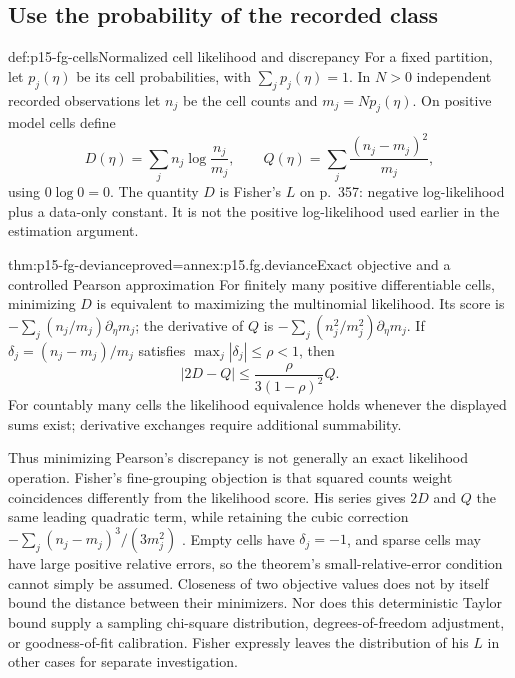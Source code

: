 \subsection{Use the probability of the recorded class}

\begin{hbdefinition}{def:p15-fg-cells}{Normalized cell likelihood and discrepancy}
For a fixed partition, let \(p_j(\eta)\) be its cell probabilities, with
\(\sum_jp_j(\eta)=1\). In \(N>0\) independent recorded observations let
\(n_j\) be the cell counts and \(m_j=Np_j(\eta)\). On positive model
cells define
\[
 D(\eta)=\sum_jn_j\log\frac{n_j}{m_j},\qquad
 Q(\eta)=\sum_j\frac{(n_j-m_j)^2}{m_j},
\]
using \(0\log0=0\). The quantity \(D\) is Fisher's \(L\) on p.~357:
negative log-likelihood plus a data-only constant. It is not the
positive log-likelihood used earlier in the estimation argument.
\end{hbdefinition}

\begin{hbtheorem}{thm:p15-fg-deviance}{proved=annex:p15.fg.deviance}{Exact objective and a controlled Pearson approximation}
For finitely many positive differentiable cells, minimizing \(D\) is
equivalent to maximizing the multinomial likelihood. Its score is
\(-\sum_j(n_j/m_j)\partial_\eta m_j\); the derivative of \(Q\) is
\(-\sum_j(n_j^2/m_j^2)\partial_\eta m_j\).
If \(\delta_j=(n_j-m_j)/m_j\) satisfies
\(\max_j|\delta_j|\leq\rho<1\), then
\[
 |2D-Q|\leq\frac{\rho}{3(1-\rho)^2}Q.
\]
For countably many cells the likelihood equivalence holds whenever the
displayed sums exist; derivative exchanges require additional summability.
\end{hbtheorem}

Thus minimizing Pearson's discrepancy is not generally an exact
likelihood operation. Fisher's fine-grouping objection is that squared
counts weight coincidences differently from the likelihood score. His
series gives \(2D\) and \(Q\) the same leading quadratic term, while
retaining the cubic correction \(-\sum_j(n_j-m_j)^3/(3m_j^2)\)
\cite[pp.~357--358]{Fisher1922Foundations}. Empty cells have
\(\delta_j=-1\), and sparse cells may have large positive relative
errors, so the theorem's small-relative-error condition cannot simply be
assumed. Closeness of two objective values does not by itself bound the
distance between their minimizers. Nor does this deterministic Taylor
bound supply a sampling chi-square distribution, degrees-of-freedom
adjustment, or goodness-of-fit calibration. Fisher expressly leaves the
distribution of his \(L\) in other cases for separate investigation.

